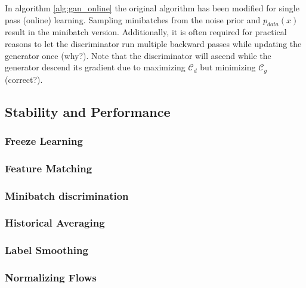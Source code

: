 \documentclass[twoside,11pt,a4paper]{article}
\theoremstyle{break}
\begin{document}
In algorithm \ref{alg:gan_online} the original algorithm has been modified for single pass (online) learning.
Sampling minibatches from the noise prior and $p_{data}(x)$ result in the minibatch version.
Additionally, it is often required for practical reasons to let the discriminator run multiple backward passes while updating the generator once (why?).
Note that the discriminator will ascend while the generator descend its gradient due to maximizing $\mathcal{C}_d$ but minimizing $\mathcal{C}_g$ (correct?).

\subsection{Stability and Performance}
\label{sub:gan_stability}

\subsubsection{Freeze Learning}
\label{ssub:gan_freeze_learning}

\subsubsection{Feature Matching}
\label{ssub:gan_feature_matching}

\subsubsection{Minibatch discrimination}
\label{ssub:gan_minibatch_discrimination}

\subsubsection{Historical Averaging}
\label{ssub:gan_historical_averaging}


\subsubsection{Label Smoothing}
\label{ssub:gan_label_smoothing}


\subsubsection{Normalizing Flows}
\label{ssub:gan_nf}
\end{document}
